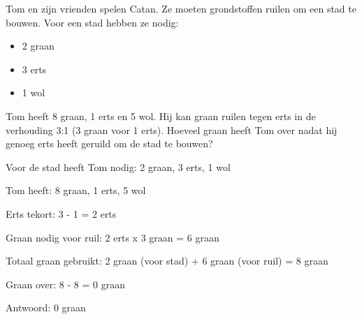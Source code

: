 \begin{opgave}
Tom en zijn vrienden spelen Catan. Ze moeten grondstoffen ruilen om een stad 
te bouwen. Voor een stad hebben ze nodig:
\begin{itemize}
\item 2 graan
\item 3 erts
\item 1 wol
\end{itemize}
Tom heeft 8 graan, 1 erts en 5 wol. Hij kan graan ruilen tegen erts in de 
verhouding 3:1 (3 graan voor 1 erts). Hoeveel graan heeft Tom over nadat hij 
genoeg erts heeft geruild om de stad te bouwen?
\end{opgave}

\begin{oplossing}
Voor de stad heeft Tom nodig: 2 graan, 3 erts, 1 wol

Tom heeft: 8 graan, 1 erts, 5 wol

Erts tekort: 3 - 1 = 2 erts

Graan nodig voor ruil: 2 erts x 3 graan = 6 graan

Totaal graan gebruikt:
2 graan (voor stad) + 6 graan (voor ruil) = 8 graan

Graan over:
8 - 8 = 0 graan

Antwoord: 0 graan
\end{oplossing}